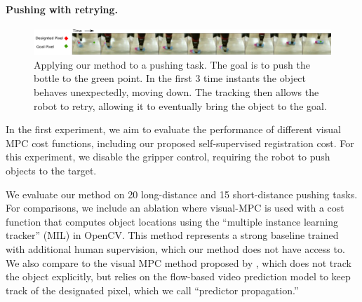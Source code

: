 \paragraph{Pushing with retrying.}
\begin{figure}
    \centering
    \includegraphics[width=1.0\textwidth]{images/push_correction.pdf}
    \caption{\small{Applying our method to a pushing task. The goal is to push the bottle to the green point. In the first 3 time instants the object behaves unexpectedly, moving down. The tracking then allows the robot to retry, allowing it to eventually bring the object to the goal.}}
    \label{fig:push_retry}
\end{figure}



In the first experiment, we aim to evaluate the performance of different visual MPC cost functions, including our proposed self-supervised registration cost. For this experiment, we disable the gripper control, requiring the robot to push objects to the target. 

We evaluate our method on 20 long-distance and 15 short-distance pushing tasks. For comparisons, we include an ablation where visual-MPC is used with a cost function that computes object locations using the ``multiple instance learning tracker'' (MIL) \cite{babenko2009visual} in OpenCV. This method represents a strong baseline trained with additional human supervision, which our method does not have access to.
We also compare to the visual MPC method proposed by \citet{sna},
which does not track the object explicitly, but relies on the flow-based video prediction model to keep track of the designated pixel, which we call ``predictor propagation.'' 

